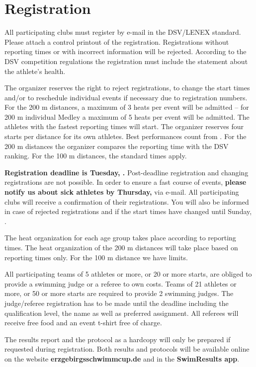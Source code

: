 \section{Registration}

All participating clubs must register by e-mail in the DSV/LENEX standard. Please attach a control printout of the registration. Registrations without reporting times or with incorrect information will be rejected. According to the DSV competition regulations the registration must include the statement about the athlete's health.

The organizer reserves the right to reject registrations, to change the start times and/or to reschedule individual events if necessary due to registration numbers. For the 200 m distances, a maximum of 3 heats per event will be admitted – for 200 m individual Medley a maximum of 5 heats per event will be admitted. The athletes with the fastest reporting times will start. The organizer reserves four starts per distance for its own athletes. Best performances count from \athleteBestDateEN. For the 200 m distances the organizer compares the reporting time with the DSV ranking. For the 100 m distances, the standard times apply.
 
\textbf{Registration deadline is Tuesday, \registrationDeadlineEN.} Post-deadline registration and changing registrations are not possible. In order to ensure a fast course of events, \textbf{please notify us about sick athletes by Thursday, \deregistrationDeadlineEN} via e-mail. All participating clubs will receive a confirmation of their registrations. You will also be informed in case of rejected registrations and if the start times have changed until Sunday, \entryConfirmationDateEN.

The heat organization for each age group takes place according to reporting times. The heat organization of the 200 m distances will take place based on reporting times only. For the 100 m distance we have limits.
  
All participating teams of 5 athletes or more, or 20 or more starts, are obliged to provide a swimming judge or a referee to own costs. Teams of 21 athletes or more, or 50 or more starts are required to provide 2 swimming judges. The judge/referee registration has to be made until the deadline including the qualification level, the name as well as preferred assignment. All referees will receive free food and an event t-shirt free of charge.

The results report and the protocol as a hardcopy will only be prepared if requested during registration. Both results and protocols will be available online on the website \textbf{erzgebirgsschwimmcup.de} and in the \textbf{SwimResults app}.

